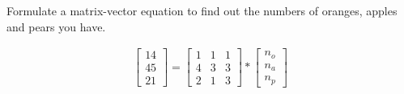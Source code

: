 Formulate a matrix-vector equation to find out the numbers of oranges, apples and pears you have.

\begin{solution}
    \begin{align*}
        \begin{bmatrix}
            14 \\ 45 \\ 21
        \end{bmatrix} = \begin{bmatrix}
            1 & 1 & 1 \\
            4 & 3 & 3 \\
            2 & 1 & 3
        \end{bmatrix} * \begin{bmatrix}
            n_o \\ n_a \\ n_p
        \end{bmatrix}
    \end{align*}
\end{solution}